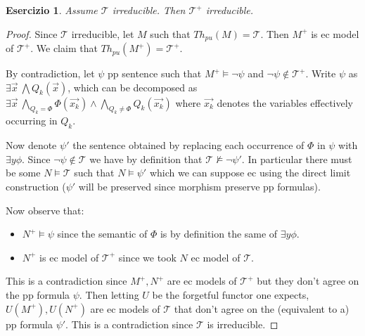 \documentclass{article}
\newtheorem{exercise}{Esercizio}
\begin{document}
\begin{exercise}

	Assume $\mathcal{T}$ irreducible. Then $\mathcal{T}^+$ irreducible.

\end{exercise}

\begin{proof}

	Since $\mathcal{T}$ irreducible, let $M$ such that $Th_{pu}(M) = \mathcal{T}$.
	Then $M^+$ is ec model of $\mathcal{T}^+$. We claim that $Th_{pu}(M^+) = \mathcal{T}^+ $.
	
	By contradiction, let $\psi$ pp sentence such that $M^+ \models \neg \psi$ and $\neg \psi \not \in \mathcal{T}^+$.
	Write $\psi$ as $\exists \vec{x} \ \bigwedge Q_k (\vec{x})$, which can be decomposed as 
	$\exists \vec{x} \ \bigwedge_{Q_k = \Phi} \Phi(\vec{x_k}) \land \bigwedge_{Q_k \not = \Phi} Q_k(\vec{x_k})$ where
	$\vec{x_k}$ denotes the variables effectively occurring in $Q_k$.
	
	Now denote $\psi'$ the sentence obtained by replacing each occurrence of $\Phi$ in $\psi$ with $\exists y \phi$.
	Since $\neg \psi \not \in \mathcal{T}$ we have by definition that $\mathcal{T} \not \models \neg \psi'$.
	In particular there must be some $N \models \mathcal{T}$ such that $N \models \psi'$ which we can suppose ec using the direct limit construction
	($\psi'$ will be preserved since morphism preserve pp formulas).
	
	Now observe that:
	\begin{itemize}
		\item $N^+ \models \psi$ since the semantic of $\Phi$ is by definition the same of $\exists y \phi$.
		\item $N^+$ is ec model of $\mathcal{T}^+$ since we took $N$ ec model of $\mathcal{T}$.
	\end{itemize}

	This is a contradiction since $M^+, N^+$ are ec models of $\mathcal{T}^+$ but they don't agree on the pp formula $\psi$.
	Then letting $U$ be the forgetful functor one expects,
	$U(M^+),U(N^+)$ are ec models of $\mathcal{T}$ that don't agree on the (equivalent to a) pp formula $\psi'$.
	This is a contradiction since $\mathcal{T}$ is irreducible.

\end{proof}
\end{document}
